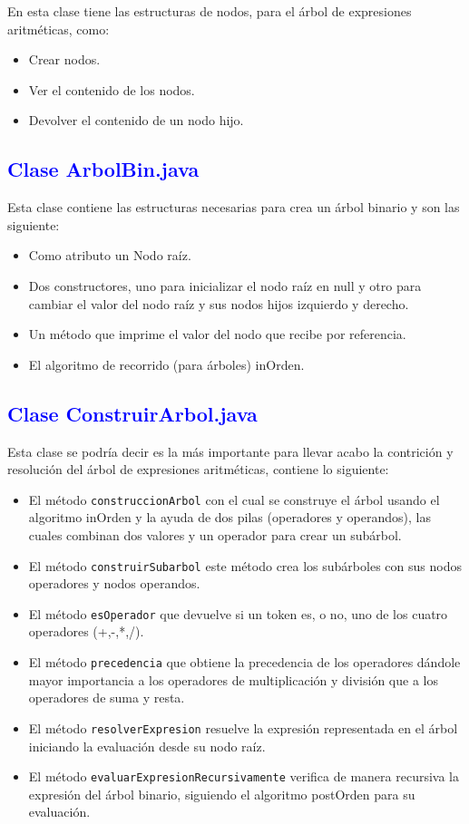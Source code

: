 \documentclass[12pt]{article}
\begin{document}
En esta clase tiene las estructuras de nodos, para el árbol de expresiones aritméticas, como: 
        \begin{itemize}
            \item Crear nodos.
            \item Ver el contenido de los nodos.
            \item Devolver el contenido de un nodo hijo.
        \end{itemize}

\subsection{\textcolor{blue}{Clase ArbolBin.java}}

Esta clase contiene las estructuras necesarias para crea un árbol binario y son las siguiente:
    \begin{itemize}
        \item Como atributo un Nodo raíz.
        \item Dos constructores, uno para inicializar el nodo raíz en null y otro para cambiar el valor del nodo raíz y sus nodos hijos izquierdo y derecho.
        \item Un método que imprime el valor del nodo que recibe por referencia.
        \item El algoritmo de recorrido (para árboles) inOrden.
    \end{itemize}

\subsection{\textcolor{blue}{Clase ConstruirArbol.java}}

Esta clase se podría decir es la más importante para llevar acabo la contrición y resolución del árbol de expresiones aritméticas, contiene lo siguiente:
    \begin{itemize}
        \item El método \verb|construccionArbol| con el cual se construye el árbol usando el algoritmo inOrden y la ayuda de dos pilas (operadores y operandos), las cuales combinan dos valores y un operador para crear un subárbol.
        \item El método \verb|construirSubarbol| este método crea los subárboles con sus nodos operadores y nodos operandos. 
        \item El método \verb|esOperador| que devuelve si un token es, o no, uno de los cuatro operadores (+,-,*,/). 
        \item El método \verb|precedencia| que obtiene la precedencia de los operadores dándole mayor importancia a los operadores de multiplicación y división que a los operadores de suma y resta.
        \item El método \verb|resolverExpresion| resuelve la expresión representada en el árbol iniciando la evaluación desde su nodo raíz.
        \item El método \verb|evaluarExpresionRecursivamente| verifica de manera recursiva la expresión del árbol binario, siguiendo el algoritmo postOrden para su evaluación.
    \end{itemize}
\end{document}
